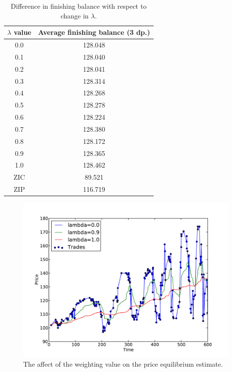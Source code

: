 \documentclass[preprint]{acm_proc_article-sp} %
\begin{document}
\begin{table}[H]
  \centering
  \begin{tabular}{ | c | c | }
    \hline
    \textbf{$\lambda$ value} & \textbf{Average finishing balance (3 dp.)} \\
    \hline
        0.0 & 128.048 \\
        0.1 & 128.040 \\
        0.2 & 128.041 \\
        0.3 & 128.314 \\
        0.4 & 128.268 \\
        0.5 & 128.278 \\
        0.6 & 128.224 \\
        0.7 & 128.380 \\
        0.8 & 128.172 \\
        0.9 & 128.365 \\
        1.0 & 128.462 \\
    \hline \hline
        ZIC &  89.521 \\
        ZIP & 116.719 \\
    \hline
  \end{tabular}
  \caption{Difference in finishing balance with respect to change in $\lambda$.}
  \label{tbl:lambda_results}
\end{table}

\begin{figure}[H]
  \centering
  \includegraphics[width=\columnwidth]{graphs_and_stats/graph_equilibriums.pdf}
  \caption{The affect of the weighting value on the price equilibrium
  \label{fig:equilibrium}
  estimate.}
\end{figure}
\end{document}
